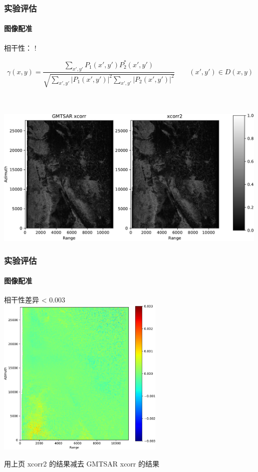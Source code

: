 \documentclass{beamer}
\begin{document}
\begin{frame}
    \frametitle{实验评估}
    \framesubtitle{图像配准}

    相干性：
     {!} {
        \begin{minipage}{\linewidth}
            \begin{equation*}
                \gamma(x, y) = \frac{\sum_{x', y'} P_1(x', y') P_2^*(x', y')}{\sqrt{\sum_{x', y'}|P_1(x', y')|^2 \sum_{x', y'}|P_2(x', y')|^2}} \qquad (x', y') \in D(x, y)
            \end{equation*}
        \end{minipage}
    }
    \\~\\
    \includegraphics[width=0.99\textwidth]{figures/coh-two}
\end{frame}

\begin{frame}
    \frametitle{实验评估}
    \framesubtitle{图像配准}

    相干性差异 < 0.003 \\
    \centering
    \includegraphics[width=0.6\textwidth]{figures/coh-diff}
    ~\\
    \begin{scriptsize} 用上页 xcorr2 的结果减去 GMTSAR xcorr 的结果 \end{scriptsize}
\end{frame}
\end{document}
